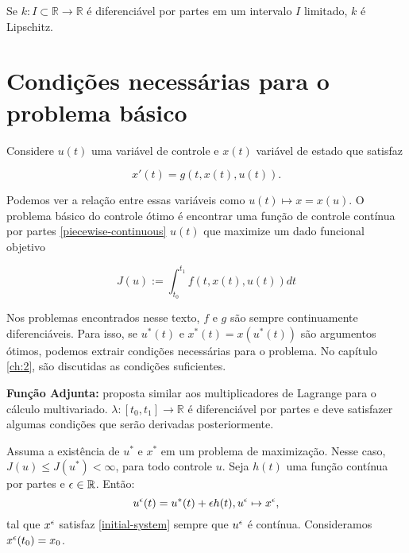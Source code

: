 \begin{exercise}
    Se $k: I \subset \mathbb{R} \to \mathbb{R}$ é diferenciável por partes em
    um intervalo $I$ limitado, $k$ é Lipschitz. 
\end{exercise}

\section{Condições necessárias para o problema básico} 

Considere $u(t)$ uma variável de controle e $x(t)$ variável de estado que
satisfaz 

\begin{equation}
    \label{initial-system}
    x'(t) = g(t,x(t),u(t)). 
\end{equation}

Podemos ver a relação entre essas variáveis
como $u(t) \mapsto x = x(u)$.  O problema básico do controle ótimo é encontrar
uma função de controle contínua por partes \ref{piecewise-continuous} $u(t)$ que
maximize um dado funcional objetivo 

\begin{equation}
    \label{objetivo}
    J(u) := \int_{t_0}^{t_1} f(t,x(t),u(t))dt    
\end{equation}

Nos problemas encontrados nesse texto, $f$ e $g$ são sempre continuamente
diferenciáveis. Para isso, se $u^{*}(t)$ e $x^*(t) = x(u^*(t))$ são
argumentos ótimos, podemos extrair condições necessárias para o problema. No
capítulo \ref{ch:2}, são discutidas as condições suficientes. 

\label{adjoint-function}
\textbf{Função Adjunta:} proposta similar aos multiplicadores de Lagrange para
o cálculo multivariado. $\lambda : [t_0,t_1] \to \mathbb{R}$ é diferenciável
por partes e deve satisfazer algumas condições que serão derivadas
posteriormente. 

Assuma a existência de $u^*$ e $x^*$ em um problema de maximização. Nesse caso, $J(u) \leq J(u^*)
< \infty$, para todo controle $u$. Seja $h(t)$ uma função contínua por partes
e $\epsilon \in \mathbb{R}$.  Então:
\begin{equation*}
    u^{\epsilon}(t) = u^*(t) + \epsilon h(t), u^{\epsilon} \mapsto x^{\epsilon}, 
\end{equation*}
tal que $x^{\epsilon}$ satisfaz \ref{initial-system} sempre que $u^{\epsilon}$ é contínua. Consideramos $x^{\epsilon}(t_0) = x_0$.

